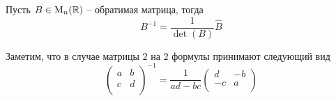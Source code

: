 \begin{claim}
Пусть $B\in\operatorname{M}_{n}(\mathbb R)$ -- обратимая матрица, тогда 
\[
B^{-1} = \frac{1}{\det(B)}\hat B
\]
\end{claim}

Заметим, что в случае матрицы $2$ на $2$ формулы принимают следующий вид
\[
\begin{pmatrix}
{a}&{b}\\
{c}&{d}\\
\end{pmatrix}^{-1}
=
\frac{1}{ad - bc}
\begin{pmatrix}
{d}&{-b}\\
{-c}&{a}\\
\end{pmatrix}
\]

